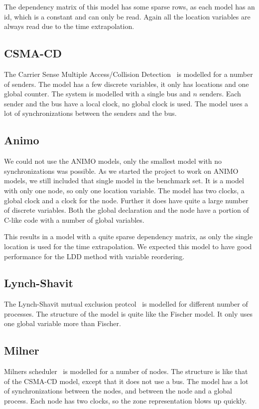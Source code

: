 The dependency matrix of this model has some sparse rows, as each model has an id, which is a constant and can only be read. Again all the location variables are always read due to the time extrapolation. 

\subsection{CSMA-CD}
The Carrier Sense Multiple Access/Collision Detection~\cite{kronos} is modelled for a number of senders. The model has a few discrete variables, it only has locations and one global counter. The system is modelled with a single bus and $n$ senders. Each sender and the bus have a local clock, no global clock is used. The model uses a lot of synchronizations between the senders and the bus.

\subsection{Animo}
We could not use the ANIMO models, only the smallest model with no synchronizations was possible. As we started the project to work on ANIMO models, we still included that single model in the benchmark set. It is a model with only one node, so only one location variable. The model has two clocks, a global clock and a clock for the node.  Further it does have quite a large number of discrete variables. Both the global declaration and the node have a portion of C-like code with a number of global variables. 

This results in a model with a quite sparse dependency matrix, as only the single location is used for the time extrapolation. We expected this model to have good performance for the LDD method with variable reordering.

\subsection{Lynch-Shavit}
The Lynch-Shavit mutual exclusion protcol~\cite{LS} is modelled for different number of processes. The structure of the model is quite like the Fischer model. It only uses one global variable more than Fischer.

\subsection{Milner}
Milners scheduler~\cite{Milner:1989:CC:534666} is modelled for a number of nodes. The structure is like that of the CSMA-CD model, except that it does not use a bus. The model has a lot of synchronizations between the nodes, and between the node and a global process. Each node has two clocks, so the zone representation blows up quickly. 

